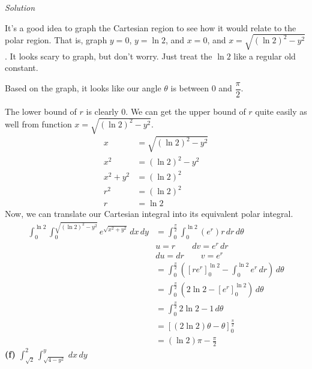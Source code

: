 \documentclass{article}
\newcommand{\lrp}[1]{\left( #1 \right)}
\newcommand{\lrb}[1]{\left[ #1 \right]}
\newcommand{\Solution}{\textit{Solution}}
\begin{document}
\Solution

It's a good idea to graph the Cartesian region to see how it would relate to the polar region. That is, graph $y=0$, $y=\ln 2$, and $x=0$, and $x=\sqrt{(\ln 2)^2-y^2}$. It looks scary to graph, but don't worry. Just treat the $\ln 2$ like a regular old constant. 
\begin{center}
\end{center}
Based on the graph, it looks like our angle $\theta$ is between $0$ and $\dfrac{\pi}{2}$.

The lower bound of $r$ is clearly $0$. We can get the upper bound of $r$ quite easily as well from function $x=\sqrt{(\ln 2)^2-y^2}$.
\begin{align*}
    x&=\sqrt{(\ln 2)^2-y^2}\\
    x^2&=(\ln 2)^2-y^2\\
    x^2+y^2&=(\ln 2)^2\\
    r^2&=(\ln 2)^2\tag{in polar, $x^2+y^2=r^2$}\\
    r&=\ln 2\tag{keep positive $r$}
\end{align*}
Now, we can translate our Cartesian integral into its equivalent polar integral.
\begin{align*}
    \int_0^{\ln 2}\int_0^{\sqrt{(\ln 2)^2-y^2}}e^{\sqrt{x^2+y^2}}\,dx\,dy&=\int_0^{\frac{\pi}{2}}\int_0^{\ln 2} (e^{r})r\,dr\,d\theta\tag{in polar, $x^2+y^2=r^2$}\\
    &u = r \hspace{2em} dv = e^r\,dr\\
    &du=dr \hspace{2em} v = e^r\\
    &=\int_0^{\frac{\pi}{2}} \lrp{\lrb{re^r}_0^{\ln 2}-\int_0^{\ln 2}e^r\,dr}\,d\theta\\
    &=\int_0^{\frac{\pi}{2}}\lrp{ 2\ln 2 -\lrb{e^r}_0^{\ln 2}}\,d\theta\\
    &=\int_0^{\frac{\pi}{2}}2\ln 2 - 1\,d\theta\\
    &=\lrb{(2\ln 2) \theta - \theta}_0^{\frac{\pi}{2}}\\
    &= \boxed{(\ln 2)\pi -\frac{\pi}{2}}
\end{align*}
\textbf{(f)} $\displaystyle \int_{\sqrt{2}}^2\int_{\sqrt{4-y^2}}^y\,dx\,dy$
\end{document}
